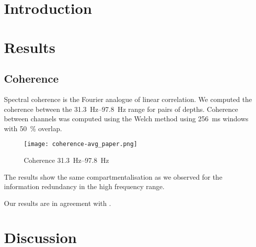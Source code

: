 \section{Introduction}

\section{Results}

\subsection{Coherence}

Spectral coherence is the Fourier analogue of linear correlation.
We computed the coherence between the \SIrange{31.3}{97.8}{Hz} range for pairs of depths.
Coherence between channels was computed using the Welch method using \SI{256}{\milli\second} windows with \SI{50}{\percent} overlap.

\begin{figure}
\centering \texttt{[image: coherence-avg\_paper.png]}
%
\caption{%
Coherence \SIrange{31.3}{97.8}{Hz}
}
\label{fig:lam_coher}
%
\end{figure}

The results show the same compartmentalisation as we observed for the information redundancy in the high frequency range.

Our results are in agreement with \citet[Figure 5B]{Maier2010}.

\section{Discussion}
